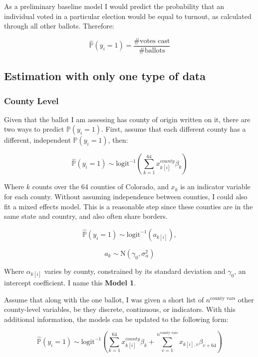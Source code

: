 \documentclass[12pt,twoside]{reedthesis}
\begin{document}
  As a preliminary baseline model I would predict the probability that an
  individual voted in a particular election would be equal to turnout, as
  calculated through all other ballots. Therefore:
  
  \[\hat{\mathbb{P}}(y_i = 1) = \frac{\# \text{votes cast}}{\# \text{ballots}}\]
  
  \subsection{Estimation with only one type of
  data}\label{estimation-with-only-one-type-of-data}
  
  \subsubsection{County Level}\label{county-level}
  
  Given that the ballot I am assessing has county of origin written on it,
  there are two ways to predict \(\mathbb{P}(y_i = 1)\). First, assume
  that each different county has a different, independent
  \(\mathbb{P}(y_i = 1)\), then:
  
  \[\hat{\mathbb{P}}(y_i = 1) \sim \text{logit}^{-1}(\sum_{k = 1}^{64}x_{k[i]}^{county}\beta_{k})\]
  
  Where \(k\) counts over the 64 counties of Colorado, and \(x_{k}\) is an
  indicator variable for each county. Without assuming independence
  between counties, I could also fit a mixed effects model. This is a
  reasonable step since these counties are in the same state and country,
  and also often share borders.
  
  \begin{equation} \tag{Model 1}
  \hat{\mathbb{P}}(y_i = 1) \sim \text{logit}^{-1}(a_{k[i]}),
  \end{equation}
  
  \[a_{k} \sim \text{N}(\gamma_0, \sigma_{\alpha}^2)\]
  
  Where \(\alpha_{k[i]}\) varies by county, constrained by its standard
  deviation and \(\gamma_0\), an intercept coefficient. I name this
  \textbf{Model 1}.
  
  Assume that along with the one ballot, I was given a short list of
  \(n^{\text{county vars}}\) other county-level variables, be they
  discrete, continuous, or indicators. With this additional information,
  the models can be updated to the following form:
  
  \[\hat{\mathbb{P}}(y_i = 1) \sim \text{logit}^{-1}(\sum_{k = 1}^{64}x_{k[i]}^{county}\beta_{k} + \sum_{v=1}^{n^{\text{county vars}}}x_{k[i], v}\beta_{v+64})\]
  
\end{document}
